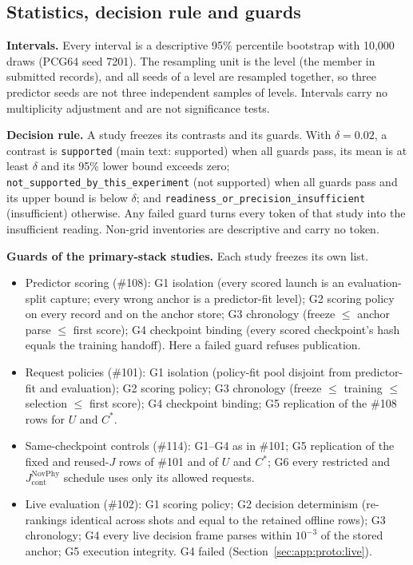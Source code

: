 \begin{revblock}
\subsection{Statistics, decision rule and guards}

\textbf{Intervals.} Every interval is a descriptive 95\% percentile bootstrap with 10,000 draws (PCG64 seed 7201). The resampling unit is the level (the member in submitted records), and all seeds of a level are resampled together, so three predictor seeds are not three independent samples of levels. Intervals carry no multiplicity adjustment and are not significance tests.

\textbf{Decision rule.} A study freezes its contrasts and its guards. With $\delta=0.02$, a contrast is \texttt{supported} (main text: supported) when all guards pass, its mean is at least $\delta$ and its 95\% lower bound exceeds zero; \texttt{not\_supported\_by\_this\_experiment} (not supported) when all guards pass and its upper bound is below $\delta$; and \texttt{readiness\_or\_precision\_insufficient} (insufficient) otherwise. Any failed guard turns every token of that study into the insufficient reading. Non-grid inventories are descriptive and carry no token.

\textbf{Guards of the primary-stack studies.} Each study freezes its own list.
\begin{itemize}
\item Predictor scoring (\#108): G1 isolation (every scored launch is an evaluation-split capture; every wrong anchor is a predictor-fit level); G2 scoring policy on every record and on the anchor store; G3 chronology (freeze $\le$ anchor parse $\le$ first score); G4 checkpoint binding (every scored checkpoint's hash equals the training handoff). Here a failed guard refuses publication.
\item Request policies (\#101): G1 isolation (policy-fit pool disjoint from predictor-fit and evaluation); G2 scoring policy; G3 chronology (freeze $\le$ training $\le$ selection $\le$ first score); G4 checkpoint binding; G5 replication of the \#108 rows for $U$ and $C^*$.
\item Same-checkpoint controls (\#114): G1--G4 as in \#101; G5 replication of the fixed and reused-$J$ rows of \#101 and of $U$ and $C^*$; G6 every restricted and $J_{\mathrm{cont}}^{\mathrm{NovPhy}}$ schedule uses only its allowed requests.
\item Live evaluation (\#102): G1 scoring policy; G2 decision determinism (re-rankings identical across shots and equal to the retained offline rows); G3 chronology; G4 every live decision frame parses within $10^{-3}$ of the stored anchor; G5 execution integrity. G4 failed (Section~\ref{sec:app:proto:live}).
\end{itemize}


\end{revblock}
